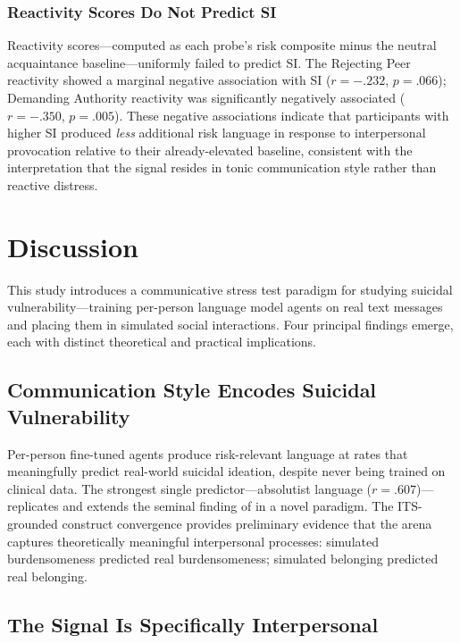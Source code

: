 \documentclass[review,12pt,authoryear]{elsarticle}
\begin{document}
\subsubsection{Reactivity Scores Do Not Predict SI}

Reactivity scores---computed as each probe's risk composite minus the neutral acquaintance baseline---uniformly failed to predict SI. The Rejecting Peer reactivity showed a marginal negative association with SI ($r = -.232$, $p = .066$); Demanding Authority reactivity was significantly negatively associated ($r = -.350$, $p = .005$). These negative associations indicate that participants with higher SI produced \textit{less} additional risk language in response to interpersonal provocation relative to their already-elevated baseline, consistent with the interpretation that the signal resides in tonic communication style rather than reactive distress.


\section{Discussion}

This study introduces a communicative stress test paradigm for studying suicidal vulnerability---training per-person language model agents on real text messages and placing them in simulated social interactions. Four principal findings emerge, each with distinct theoretical and practical implications.

\subsection{Communication Style Encodes Suicidal Vulnerability}

Per-person fine-tuned agents produce risk-relevant language at rates that meaningfully predict real-world suicidal ideation, despite never being trained on clinical data. The strongest single predictor---absolutist language ($r = .607$)---replicates and extends the seminal finding of \citet{almosaiwi2018absolute} in a novel paradigm. The ITS-grounded construct convergence provides preliminary evidence that the arena captures theoretically meaningful interpersonal processes: simulated burdensomeness predicted real burdensomeness; simulated belonging predicted real belonging.

\subsection{The Signal Is Specifically Interpersonal}
\end{document}
